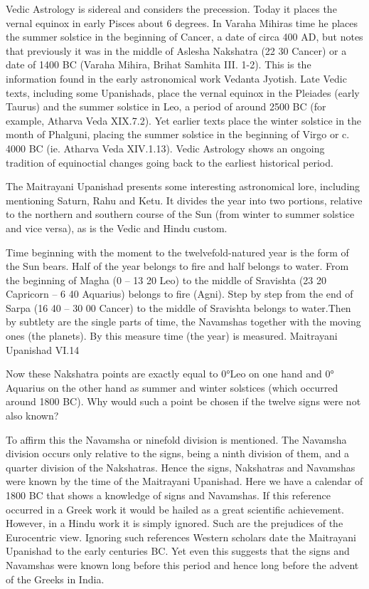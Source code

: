  

Vedic Astrology is sidereal and considers the precession. Today it places the vernal equinox in early Pisces about 6 degrees. In Varaha Mihiras time he places the summer solstice in the beginning of Cancer, a date of circa 400 AD, but notes that previously it was in the middle of Aslesha Nakshatra (22 30 Cancer) or a date of 1400 BC (Varaha Mihira, Brihat Samhita III. 1-2). This is the information found in the early astronomical work Vedanta Jyotish. Late Vedic texts, including some Upanishads, place the vernal equinox in the Pleiades (early Taurus) and the summer solstice in Leo, a period of around 2500 BC (for example, Atharva Veda XIX.7.2). Yet earlier texts place the winter solstice in the month of Phalguni, placing the summer solstice in the beginning of Virgo or c. 4000 BC (ie. Atharva Veda XIV.1.13). Vedic Astrology shows an ongoing tradition of equinoctial changes going back to the earliest historical period.

 

The Maitrayani Upanishad presents some interesting astronomical lore, including mentioning Saturn, Rahu and Ketu. It divides the year into two portions, relative to the northern and southern course of the Sun (from winter to summer solstice and vice versa), as is the Vedic and Hindu custom.

 

Time beginning with the moment to the twelvefold-natured year is the form of the Sun bears. Half of the year belongs to fire and half belongs to water. From the beginning of Magha (0 – 13 20 Leo) to the middle of Sravishta (23 20 Capricorn – 6 40 Aquarius) belongs to fire (Agni). Step by step from the end of Sarpa (16 40 – 30 00 Cancer) to the middle of Sravishta belongs to water.Then by subtlety are the single parts of time, the Navamshas together with the moving ones (the planets). By this measure time (the year) is measured.
Maitrayani Upanishad VI.14

 

Now these Nakshatra points are exactly equal to 0°Leo on one hand and 0° Aquarius on the other hand as summer and winter solstices (which occurred around 1800 BC). Why would such a point be chosen if the twelve signs were not also known?

 

To affirm this the Navamsha or ninefold division is mentioned. The Navamsha division occurs only relative to the signs, being a ninth division of them, and a quarter division of the Nakshatras. Hence the signs, Nakshatras and Navamshas were known by the time of the Maitrayani Upanishad. Here we have a calendar of 1800 BC that shows a knowledge of signs and Navamshas. If this reference occurred in a Greek work it would be hailed as a great scientific achievement. However, in a Hindu work it is simply ignored. Such are the prejudices of the Eurocentric view. Ignoring such references Western scholars date the Maitrayani Upanishad to the early centuries BC. Yet even this suggests that the signs and Navamshas were known long before this period and hence long before the advent of the Greeks in India.

